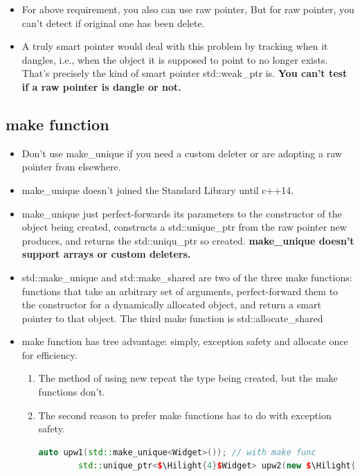 \documentclass[a4paper,12pt,twoside]{book}
\newcommand{\Hilight}[1]{\makebox[0pt][l]{\color{yellow}\rule[-3pt]{#1em}{11pt}}}
\begin{document}
\begin{itemize}
\item For above requirement, you also can use raw pointer, But for raw pointer, you can't detect if original one has been delete. 

\item A truly smart pointer would deal with this problem by tracking
when it dangles, i.e., when the object it is supposed to point to no longer exists. That's precisely the kind of smart pointer std::weak\_ptr is. \textbf{You can't test if a raw pointer is dangle or not.}

\end{itemize}
\subsection{make function}
\begin{itemize}
	
	\item Don't use make\_unique if you need a custom deleter or are adopting a raw pointer from elsewhere.
	
	\item make\_unique doesn't joined the Standard Library until c++14.
	
	\item make\_unique just perfect-forwards its parameters to the constructor of the object being created, constructs a std::unique\_ptr from the raw pointer new produces, and returns the std::uniqu\_ptr so created. \textbf{make\_unique doesn't support arrays or custom deleters.}
	
	\item std::make\_unique and std::make\_shared are two of the three make functions: functions that take an arbitrary set of arguments, perfect-forward them to the constructor for a dynamically allocated object, and return a smart pointer to that object. The third make function is std::allocate\_shared
	
	\item make function has tree advantage: simply, exception safety and allocate once for efficiency.
	
	\begin{enumerate}
		\item The method of using new repeat the type being created, but the make functions don't.  
		
		\item The second reason to prefer make functions has to do with exception safety.
		\begin{lstlisting}[frame=single, language=c++, mathescape=true]
		auto upw1(std::make_unique<Widget>()); // with make func
		std::unique_ptr<$\Hilight{4}$Widget> upw2(new $\Hilight{4}$Widget); // without make func
		

\end{lstlisting}
\end{enumerate}
\end{itemize}
\end{document}
